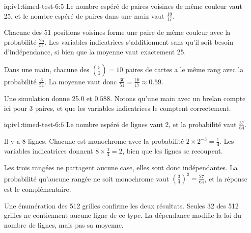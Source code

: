 \begin{solution}{iq:iv1:timed-test-6:5}
Le nombre espéré de paires voisines de même couleur vaut 25, et le nombre espéré de paires dans une main vaut $\frac{10}{17}$.

Chacune des 51 positions voisines forme une paire de même couleur avec la probabilité $\frac{25}{51}$. Les variables indicatrices s'additionnent sans qu'il soit besoin d'indépendance, si bien que la moyenne vaut exactement 25.

Dans une main, chacune des $\binom52 = 10$ paires de cartes a le même rang avec la probabilité $\frac{3}{51}$. La moyenne vaut donc $\frac{30}{51} = \frac{10}{17} \approx 0.59$.

Une simulation donne 25.0 et $0.588$. Notons qu'une main avec un brelan compte ici pour 3 paires, et que les variables indicatrices le comptent correctement.

\end{solution}

\begin{solution}{iq:iv1:timed-test-6:6}
Le nombre espéré de lignes vaut 2, et la probabilité vaut $\frac{37}{64}$.

Il y a 8 lignes. Chacune est monochrome avec la probabilité $2 \times 2^{-3} = \frac14$. Les variables indicatrices donnent $8 \times \frac14 = 2$, bien que les lignes se recoupent.

Les trois rangées ne partagent aucune case, elles sont donc indépendantes. La probabilité qu'aucune rangée ne soit monochrome vaut $(\frac34)^3 = \frac{27}{64}$, et la réponse est le complémentaire.

Une énumération des 512 grilles confirme les deux résultats. Seules 32 des 512 grilles ne contiennent aucune ligne de ce type. La dépendance modifie la loi du nombre de lignes, mais pas sa moyenne.

\end{solution}

